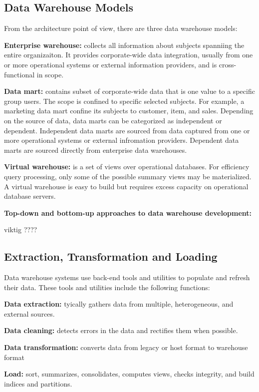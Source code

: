 	\clearpage
	\subsection{Data Warehouse Models}
		From the architecture point of view, there are three data warehouse models:

		{\bf Enterprise warehouse:} collects all information about subjects spanniing the
		entire organizaiton. It provides corporate-wide data integration, usually from
		one or more operational systems or external information providers, 
		and is cross-functional in scope. 

		{\bf Data mart:} contains subset of corporate-wide data that is one value to
		a specific group users. The scope is confined to specific selected subjects. 
		For example,  a marketing data mart confine its subjects to customer, item, and sales. 
		Depending on the source of data, data marts can be categorized as independent
		or dependent. Independent data marts are sourced from data captured from one
		or more operational systems or external infromation providers.
		Dependent data marts are sourced directly from enterprise data warehouses. 

		{\bf Virtual warehouse:} is a set of views over operational databases.
		For efficiency query processing, only some of the possible summary views may
		be materialized. A virtual warehouse is easy to build but requires excess capacity
		on operational database servers. 

		{\bf Top-down and bottom-up approaches to data warehouse development:}

		{\color{red} viktig ????}

	\subsection{Extraction, Transformation and Loading}

		Data warehouse systems use back-end tools and utilities to populate and refresh
		their data. These tools and utilities include the following functions:

			{\bf Data extraction:} tyically gathers data from multiple, heterogeneous,
			and external sources. 

			{\bf Data cleaning:} detects errors in the data and rectifies them when possible.
			
			{\bf Data transformation:} converts data from legacy or host format to warehouse
			format
			
			{\bf Load:} sort, summarizes, consolidates, computes views, checks integrity, and
			build indices and partitions. 
			
